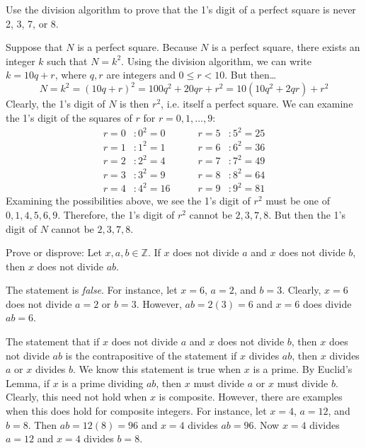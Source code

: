 \documentclass[11pt,letterpaper]{article}
\begin{document}
 Use the division algorithm to prove that the 1's digit of a perfect square is never 2, 3, 7, or 8. \pspace

\sol Suppose that $N$ is a perfect square. Because $N$ is a perfect square, there exists an integer $k$ such that $N= k^2$. Using the division algorithm, we can write $k= 10q + r$, where $q, r$ are integers and $0 \leq r < 10$. But then\dots
	\[
	N= k^2= (10q + r)^2= 100q^2 + 20qr + r^2= 10(10q^2 + 2qr) + r^2
	\]
Clearly, the 1's digit of $N$ is then $r^2$, i.e. itself a perfect square. We can examine the 1's digit of the squares of $r$ for $r= 0, 1, \ldots, 9$:
	\[
	\begin{aligned}
	r= 0 &\colon 0^2= 0 &\qquad r= 5 &\colon 5^2= 25 \\
	r= 1 &\colon 1^2= 1 &\qquad r= 6 &\colon 6^2= 36 \\
	r= 2 &\colon 2^2= 4 &\qquad r= 7 &\colon 7^2= 49 \\
	r= 3 &\colon 3^2= 9 &\qquad r= 8 &\colon 8^2= 64 \\
	r= 4 &\colon 4^2= 16 &\qquad r= 9 &\colon 9^2= 81
	\end{aligned}
	\]
Examining the possibilities above, we see the 1's digit of $r^2$ must be one of $0, 1, 4, 5, 6, 9$. Therefore, the 1's digit of $r^2$ cannot be $2, 3, 7, 8$. But then the 1's digit of $N$ cannot be $2, 3, 7, 8$. 



\newpage
 
 
 

 Prove or disprove: Let $x, a, b \in \mathbb{Z}$. If $x$ does not divide $a$ and $x$ does not divide $b$, then $x$ does not divide $ab$. \pspace

\sol The statement is \textit{false}. For instance, let $x= 6$, $a= 2$, and $b= 3$. Clearly, $x= 6$ does not divide $a= 2$ or $b= 3$. However, $ab= 2(3)= 6$ and $x= 6$ does divide $ab= 6$. \pspace

The statement that if $x$ does not divide $a$ and $x$ does not divide $b$, then $x$ does not divide $ab$ is the contrapositive of the statement if $x$ divides $ab$, then $x$ divides $a$ or $x$ divides $b$. We know this statement is true when $x$ is a prime. By Euclid's Lemma, if $x$ is a prime dividing $ab$, then $x$ must divide $a$ or $x$ must divide $b$. Clearly, this need not hold when $x$ is composite. However, there are examples when this does hold for composite integers. For instance, let $x= 4$, $a= 12$, and $b= 8$. Then $ab= 12(8)= 96$ and $x= 4$ divides $ab= 96$. Now $x= 4$ divides $a= 12$ and $x= 4$ divides $b= 8$. 
\end{document}
